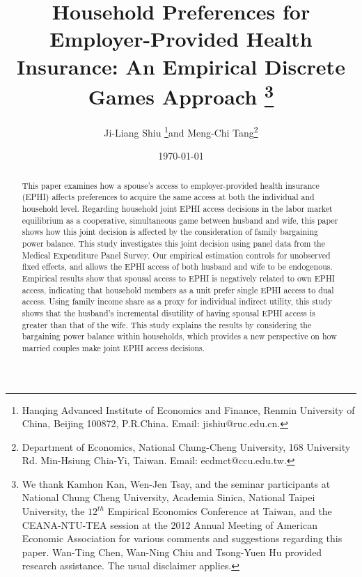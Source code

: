 \documentclass[legno,11pt]{article}
\begin{document}
\title{Household Preferences for Employer-Provided Health
Insurance: An Empirical Discrete Games Approach
\thanks{We thank Kamhon Kan, Wen-Jen Tsay, and the seminar participants at National Chung Cheng University, Academia Sinica, National Taipei University, the  $12^{th}$ Empirical Economics Conference at Taiwan, and the CEANA-NTU-TEA session at the 2012 Annual Meeting of American Economic Association for various comments and suggestions regarding this paper. Wan-Ting Chen, Wan-Ning Chiu and Tsong-Yuen Hu provided research assistance. The usual disclaimer applies.}
}
\author{Ji-Liang Shiu
\thanks{%
Hanqing Advanced Institute of Economics and Finance, Renmin
University of China, Beijing 100872, P.R.China. Email:
jishiu@ruc.edu.cn.}and Meng-Chi Tang\thanks{Department of Economics,
National Chung-Cheng University, 168 University Rd. Min-Hsiung
Chia-Yi, Taiwan. Email: ecdmct@ccu.edu.tw. } }

\date{\today}
\maketitle

\begin{abstract}
This paper examines how a spouse's access to employer-provided
health insurance (EPHI) affects preferences to acquire the same
access at both the individual and household level. Regarding
household joint EPHI access decisions in the labor market
equilibrium as a cooperative, simultaneous game between husband and
wife, this paper shows how this joint decision is affected by the
consideration of family bargaining power balance. This study
investigates this joint decision using panel data from the
Medical Expenditure Panel Survey. Our empirical estimation
controls for unobserved fixed effects, and allows the EPHI
access of both husband and wife to be endogenous.
Empirical results show that spousal access to EPHI is
negatively related to own EPHI access, indicating that
household members as a unit prefer single EPHI access
to dual access. Using family income share as a proxy for
individual indirect utility, this study shows that the husband's incremental disutility of having
spousal EPHI access is greater than that of the wife.
This study explains the results by considering the bargaining power balance within households, which provides a new perspective
on how married couples make joint EPHI access decisions.

\end{abstract}
\end{document}
